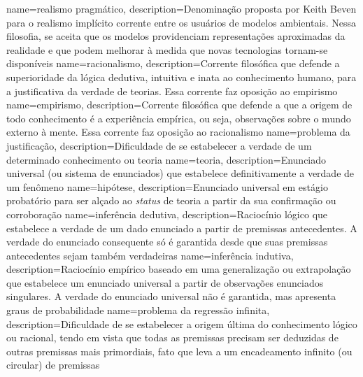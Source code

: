 \makeglossaries

{
    name=realismo pragmático,
    description={Denominação proposta por Keith Beven para o realismo implícito corrente entre os usuários de modelos ambientais. Nessa filosofia, se aceita que os modelos providenciam representações aproximadas da realidade e que podem melhorar à medida que novas tecnologias tornam-se disponíveis}
}
{
    name=racionalismo,
    description={Corrente filosófica que defende a superioridade da lógica dedutiva, intuitiva e inata ao conhecimento humano, para a justificativa da verdade de teorias. Essa corrente faz oposição ao empirismo}
}
{
    name=empirismo,
    description={Corrente filosófica que defende a que a origem de todo conhecimento é a experiência empírica, ou seja, observações sobre o mundo externo à mente. Essa corrente faz oposição ao racionalismo}
}
{
    name=problema da justificação,
    description={Dificuldade de se estabelecer a verdade de um determinado conhecimento ou teoria}
}
{
    name=teoria,
    description={Enunciado universal (ou sistema de enunciados) que estabelece definitivamente a verdade de um fenômeno}
}
{
    name=hipótese,
    description={Enunciado universal em estágio probatório para ser alçado ao \textit{status} de teoria a partir da sua confirmação ou corroboração}
}
{
    name=inferência dedutiva,
    description={Raciocínio lógico que estabelece a verdade de um dado enunciado a partir de premissas antecedentes. A verdade do enunciado consequente só é garantida desde que suas premissas antecedentes sejam também verdadeiras}
}
{
    name=inferência indutiva,
    description={Raciocínio empírico baseado em uma generalização ou extrapolação que estabelece um enunciado universal a partir de observações enunciados singulares. A verdade do enunciado universal não é garantida, mas apresenta graus de probabilidade}
}
{
    name=problema da regressão infinita,
    description={Dificuldade de se estabelecer a origem última do conhecimento lógico ou racional, tendo em vista que todas as premissas precisam ser deduzidas de outras premissas mais primordiais, fato que leva a um encadeamento infinito (ou circular) de premissas}
}
